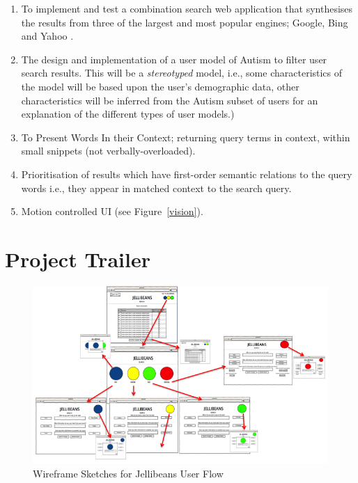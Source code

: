 \documentclass[a4paper, 11pt]{article}
\begin{document}
\begin{enumerate}
\item  {To implement and test a combination search web application that synthesises the results from three of the largest and most popular engines; Google, Bing and Yahoo \cite{adam}.}

\item {The design and implementation of a user model of Autism to filter user search results. This will be a \textit{stereotyped} model, i.e., some characteristics of the model will be based upon the user's demographic data, other characteristics will be inferred from the Autism subset of users for an explanation of the different types of user models.)}

\item {To Present Words In their Context; returning query terms in context, within small snippets (not verbally-overloaded).}

\item {Prioritisation of results which have first-order semantic relations to the query words i.e., they appear in matched context to the search query.}

\item {Motion controlled UI (see Figure~\ref{vision}).}
\end{enumerate}





\section{Project Trailer}

\begin{figure}[H]
\begin{center}
\includegraphics[scale=0.7]{JellibeanUserFlow.png}
\end{center}
\caption{Wireframe Sketches for Jellibeans User Flow}
\label{JBeanUserFlow}
\end{figure}
\end{document}
